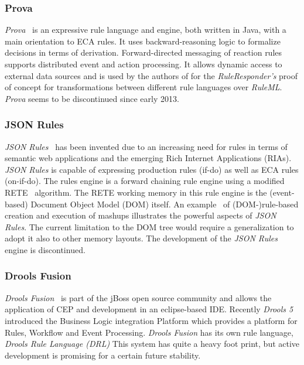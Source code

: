 \documentclass[11pt]{article}%
\begin{document}
\subsubsection{Prova}
\emph{Prova}~\cite{wwwprova} is an expressive rule language and engine, both written in Java, with a main orientation to ECA rules. It uses backward-reasoning logic to formalize decisions in terms of derivation. Forward-directed messaging of reaction rules supports distributed event and action processing. It allows dynamic access to external data sources and is used by the authors of \cite{2013_Zhao-Paschke_EDSWE.pdf,2007-Paschke_etal-RuleResponder.pdf} for the \emph{RuleResponder's} proof of concept for transformations between different rule languages over \emph{RuleML}. \emph{Prova} seems to be discontinued since early 2013. 

\subsubsection{JSON Rules}
\emph{JSON Rules}~\cite{2008-Giurca_Pascalau-JSON_Rules.pdf} has been invented due to an increasing need for rules in terms of semantic web applications and the emerging Rich Internet Applications (RIAs). \emph{JSON Rules} is capable of expressing production rules (if-do) as well as ECA rules (on-if-do). The rules engine is a forward chaining rule engine using a modified RETE~\cite{1982-Crockford-RETE.pdf} algorithm. The RETE working memory in this rule engine is the (event-based) Document Object Model (DOM) itself. An example~\cite{2009-Pascalau_Giurca-RBACEM.pdf} of (DOM-)rule-based creation and execution of mashups illustrates the powerful aspects of \emph{JSON Rules}. The current limitation to the DOM tree would require a generalization to adopt it also to other memory layouts. The development of the \emph{JSON Rules} engine is discontinued.

\subsubsection{Drools Fusion}
\emph{Drools Fusion}~\cite{wwwdrools} is part of the jBoss open source community and allows the application of CEP and development in an eclipse-based IDE. Recently \emph{Drools 5} introduced the Business Logic integration Platform which provides a platform for Rules, Workflow and Event Processing. \emph{Drools Fusion} has its own rule language, \emph{Drools Rule Language (DRL)} This system has quite a heavy foot print, but active development is promising for a certain future stability.
\end{document}
